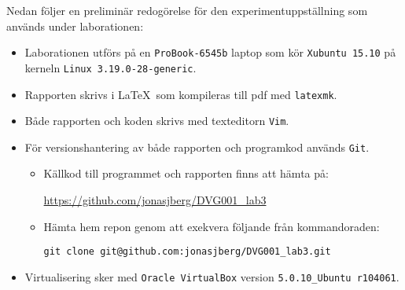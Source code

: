 Nedan följer en preliminär redogörelse för den experimentuppställning som används
under laborationen:

\begin{itemize}
  \item Laborationen utförs på en \texttt{ProBook-6545b} laptop som kör
        \texttt{Xubuntu 15.10} på kerneln \texttt{Linux 3.19.0-28-generic}.

  \item Rapporten skrivs i \LaTeX\  som kompileras till pdf med \texttt{latexmk}.

  \item Både rapporten och koden skrivs med texteditorn \texttt{Vim}.

  \item För versionshantering av både rapporten och programkod används \texttt{Git}.
    \begin{itemize}
      \item Källkod till programmet och rapporten finns att hämta på:

            \url{https://github.com/jonasjberg/DVG001\_lab3}

      \item Hämta hem repon genom att exekvera följande från kommandoraden:
            
            \texttt{git clone git@github.com:jonasjberg/DVG001\_lab3.git}

    \end{itemize}

  \item Virtualisering sker med \texttt{Oracle VirtualBox} version
        \texttt{5.0.10\_Ubuntu r104061}.
\end{itemize}

